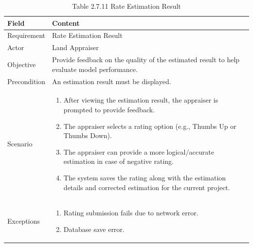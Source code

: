 \documentclass[12pt,oneside]{report}
\begin{document}
\begin{table}[H]
\centering
\caption{Table 2.7.11 Rate Estimation Result}
\label{tab:req-rate-estimation}
\begin{tabularx}{\textwidth}{|p{3cm}|X|}
\hline
\textbf{Field} & \textbf{Content} \\ \hline

Requirement & Rate Estimation Result \\ \hline

Actor & Land Appraiser \\ \hline

Objective & Provide feedback on the quality of the estimated result to help evaluate model performance. \\ \hline

Precondition & An estimation result must be displayed. \\ \hline

Scenario & 
\begin{minipage}[t]{0.75\textwidth}
\begin{enumerate}[leftmargin=*,label=\arabic*.]
\item After viewing the estimation result, the appraiser is prompted to provide feedback.
\item The appraiser selects a rating option (e.g., Thumbs Up or Thumbs Down).
\item The appraiser can provide a more logical/accurate estimation in case of negative rating.
\item The system saves the rating along with the estimation details and corrected estimation for the current project.
\end{enumerate}
\end{minipage} \\ \hline

Exceptions & 
\begin{minipage}[t]{0.75\textwidth}
\begin{enumerate}[leftmargin=*,label=\arabic*.]
\item Rating submission fails due to network error.
\item Database save error.
\end{enumerate}
\end{minipage} \\ \hline
\end{tabularx}
\end{table}
\end{document}
